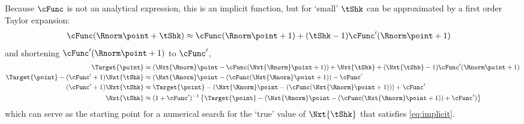 \documentclass[../BufferStockTheory.tex]{subfiles}\usepackage{ApndxSteadyState}
\begin{document}
  \begin{comment}
    For any given current value $\point$ (and treating $\Nxt{\pShk}$ and $\Nxt{\Rnorm}=\Rfree (\PGro \Nxt{\pShk})^{-1}$ as predetermined).
    \begin{align}
      \Target{\point}(\tShk) & = 
                               \Nxt{\Rnorm} \point + \Nxt{\tShk} - \cFunc(\Nxt{\Rnorm}\point+\Nxt{\tShk})
                               \label{eq:implicit}
    \end{align}
  \end{comment}
  Because $\cFunc$ is not an analytical expression, this is an implicit function, but for `small' $\tShk$ can be approximated by
  a first order Taylor expansion:
  \begin{align}
    \cFunc(\Rnorm \point + \tShk) & \approx   \cFunc(\Rnorm \point + 1)+ (\tShk-1)\cFunc^{\prime}(\Rnorm \point + 1)
  \end{align}
  and shortening $\cFunc^{\prime}(\Rnorm \point + 1)$ to $\cFunc^{\prime}$,
  \begin{align}
    \Target{\point} & \approx \left(
                      \Nxt{\Rnorm} \point  - \cFunc(\Nxt{\Rnorm}\point+1)
                      \right)
                      +\Nxt{\tShk}+(\Nxt{\tShk}-1)\cFunc^{\prime}(\Rnorm \point + 1)
    \\ \Target{\point} -(\cFunc^{\prime}+1)\Nxt{\tShk} & \approx  \left(\Nxt{\Rnorm} \point  - (\cFunc(\Nxt{\Rnorm}\point+1)\right)-\cFunc^{\prime}
    \\  (\cFunc^{\prime}+1)\Nxt{\tShk} & \approx \Target{\point}- \left(\Nxt{\Rnorm} \point  - (\cFunc(\Nxt{\Rnorm}\point+1))\right)+\cFunc^{\prime}                                             \\  \Nxt{\tShk} & \approx  (1+\cFunc^{\prime})^{-1}\left\{\Target{\point}- \left(\Nxt{\Rnorm} \point  - (\cFunc(\Nxt{\Rnorm}\point+1)\right)+\cFunc^{\prime})\right\}
  \end{align}
  which can serve as the starting point for a numerical search for the `true' value of $\Nxt{\tShk}$ that satisfies \eqref{eq:implicit}.
\end{document}
